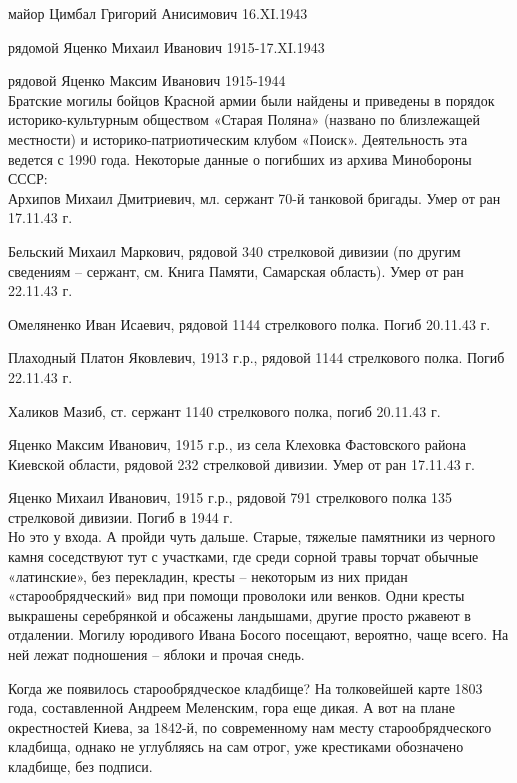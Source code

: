 \noindent
майор Цимбал Григорий Анисимович 16.XI.1943

\noindent
рядомой Яценко Михаил Иванович 1915-17.XI.1943

\noindent
рядовой Яценко Максим Иванович 1915-1944\\

Братские могилы бойцов Красной армии были найдены и приведены в порядок историко-культурным обществом «Старая Поляна» (названо по близлежащей местности) и историко-патриотическим клубом «Поиск». Деятельность эта ведется с 1990 года. Некоторые данные о погибших из архива Минобороны СССР:\\ 

\noindent
Архипов Михаил Дмитриевич, мл. сержант 70-й танковой бригады. Умер от ран 17.11.43 г. 

\noindent
Бельский Михаил Маркович, рядовой 340 стрелковой дивизии (по другим сведениям – сержант, см. Книга Памяти, Самарская область). Умер от ран 22.11.43 г. 

\noindent
Омеляненко Иван Исаевич, рядовой 1144 стрелкового полка. Погиб 20.11.43 г.

\noindent
Плаходный Платон Яковлевич, 1913 г.р., рядовой 1144 стрелкового полка. Погиб 22.11.43 г. 

\noindent
Халиков Мазиб, ст. сержант 1140 стрелкового полка, погиб 20.11.43 г.

\noindent
Яценко Максим Иванович, 1915 г.р., из села Клеховка Фастовского района Киевской области, рядовой 232 стрелковой дивизии. Умер от ран 17.11.43 г. 

\noindent
Яценко Михаил Иванович, 1915 г.р., рядовой 791 стрелкового полка 135 стрелковой дивизии. Погиб в 1944 г.\\


Но это у входа. А пройди чуть дальше. Старые, тяжелые памятники из черного камня соседствуют тут с участками, где среди сорной травы торчат обычные «латинские», без перекладин, кресты – некоторым из них придан «старообрядческий» вид при помощи проволоки или венков. Одни кресты выкрашены серебрянкой и обсажены ландышами, другие просто ржавеют в отдалении. Могилу юродивого Ивана Босого посещают, вероятно, чаще всего. На ней лежат подношения – яблоки и прочая снедь.

Когда же появилось старообрядческое кладбище? На толковейшей карте 1803 года, составленной Андреем Меленским, гора еще дикая. А вот на плане окрестностей Киева, за 1842-й, по современному нам месту старообрядческого кладбища, однако не углубляясь на сам отрог, уже крестиками обозначено кладбище, без подписи.

